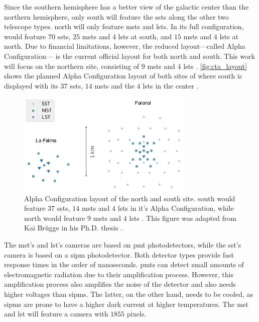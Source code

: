 Since the southern hemisphere has a better view of the galactic center than the northern hemisphere,
only \cta{} south will feature the \glspl{sst} along the other two telescope types. \cta{} north
will only feature \glspl{mst} and \glspl{lst}. In its full configuration, \cta{} would feature
\(\num{70}\) \glspl{sst}, \(\num{25}\) \glspl{mst} and \(\num{4}\) \glspl{lst} at \cta{} south,
and \(\num{15}\) \glspl{mst} and \(\num{4}\) \glspl{lst} at \cta{} north. Due to financial limitations,
however, the reduced layout---called Alpha Configuration--- is the current official layout for both \cta{}
north and south. This work will focus on the northern site, consisting of \(\num{9}\) \glspl{mst}
and \(\num{4}\) \glspl{lst} \cite{cta_north_layout}. \autoref{fig:cta_layout} shows the planned
Alpha Configuration layout of both sites of \cta{} where \cta{} south is displayed with its
\(\num{37}\) \glspl{sst}, \(\num{14}\) \glspl{mst} and the \(\num{4}\) \glspl{lst} in the center
\cite{cta_south_layout}.
\begin{figure}
    \centering
    \includegraphics[width=0.75\textwidth]{graphics/cta_layout.pdf}
    \caption{Alpha Configuration layout of the \cta{} north and \cta{}
    south site. \cta{} south would feature \(\num{37}\) \glspl{sst}, \(\num{14}\) \glspl{mst} and
    \(\num{4}\) \glspl{lst} \cite{cta_south_layout} in it's Alpha Configuration, while \cta{} north would
    feature \(\num{9}\) \glspl{mst} and \(\num{4}\) \glspl{lst} \cite{cta_north_layout}.
    This figure was adapted from Kai Br\"ugge in his Ph.D. thesis \cite{bruegge_thesis}.}
    \label{fig:cta_layout}
\end{figure}

The \gls{mst}'s and \gls{lst}'s cameras are based on \gls{pmt} photodetectors, while the \gls{sst}'s
camera is based on a \gls{sipm} photodetector. Both detector types provide fast response times in the
order of nanoseconds. \glspl{pmt} can detect small amounts of electromagnetic radiation due to their
amplification process. However, this amplification process also amplifies the noise of the detector
and also needs higher voltages than \glspl{sipm}. The latter, on the other hand, needs to be cooled,
as \glspl{sipm} are prone to have a higher dark current at higher temperatures. The \gls{mst} and
\gls{lst} will feature a camera with \(\num{1855}\) pixels.

